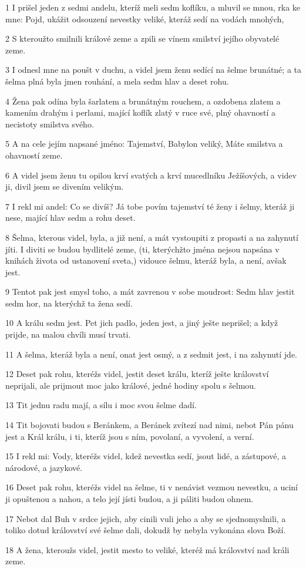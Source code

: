 \par 1 I prišel jeden z sedmi andelu, kteríž meli sedm koflíku, a mluvil se mnou, rka ke mne: Pojd, ukážit odsouzení nevestky veliké, kteráž sedí na vodách mnohých,
\par 2 S kteroužto smilnili králové zeme a zpili se vínem smilství jejího obyvatelé zeme.
\par 3 I odnesl mne na poušt v duchu, a videl jsem ženu sedící na šelme brunátné; a ta šelma plná byla jmen rouhání, a mela sedm hlav a deset rohu.
\par 4 Žena pak odína byla šarlatem a brunátným rouchem, a ozdobena zlatem a kamením drahým i perlami, mající koflík zlatý v ruce své, plný ohavností a necistoty smilstva svého.
\par 5 A na cele jejím napsané jméno: Tajemství, Babylon veliký, Máte smilstva a ohavností zeme.
\par 6 A videl jsem ženu tu opilou krví svatých a krví mucedlníku Ježíšových, a videv ji, divil jsem se divením velikým.
\par 7 I rekl mi andel: Co se divíš? Já tobe povím tajemství té ženy i šelmy, kteráž ji nese, mající hlav sedm a rohu deset.
\par 8 Šelma, kterous videl, byla, a již není, a mát vystoupiti z propasti a na zahynutí jíti. I diviti se budou bydlitelé zeme, (ti, kterýchžto jména nejsou napsána v knihách života od ustanovení sveta,) vidouce šelmu, kteráž byla, a není, avšak jest.
\par 9 Tentot pak jest smysl toho, a mát zavrenou v sobe moudrost: Sedm hlav jestit sedm hor, na kterýchž ta žena sedí.
\par 10 A králu sedm jest. Pet jich padlo, jeden jest, a jiný ješte neprišel; a když prijde, na malou chvíli musí trvati.
\par 11 A šelma, kteráž byla a není, onat jest osmý, a z sedmit jest, i na zahynutí jde.
\par 12 Deset pak rohu, kteréžs videl, jestit deset králu, kteríž ješte království neprijali, ale prijmout moc jako králové, jedné hodiny spolu s šelmou.
\par 13 Tit jednu radu mají, a sílu i moc svou šelme dadí.
\par 14 Tit bojovati budou s Beránkem, a Beránek zvítezí nad nimi, nebot Pán pánu jest a Král králu, i ti, kteríž jsou s ním, povolaní, a vyvolení, a verní.
\par 15 I rekl mi: Vody, kteréžs videl, kdež nevestka sedí, jsout lidé, a zástupové, a národové, a jazykové.
\par 16 Deset pak rohu, kteréžs videl na šelme, ti v nenávist vezmou nevestku, a uciní ji opuštenou a nahou, a telo její jísti budou, a ji páliti budou ohnem.
\par 17 Nebot dal Buh v srdce jejich, aby cinili vuli jeho a aby se sjednomyslnili, a toliko dotud království své šelme dali, dokudž by nebyla vykonána slova Boží.
\par 18 A žena, kteroužs videl, jestit mesto to veliké, kteréž má království nad králi zeme.

